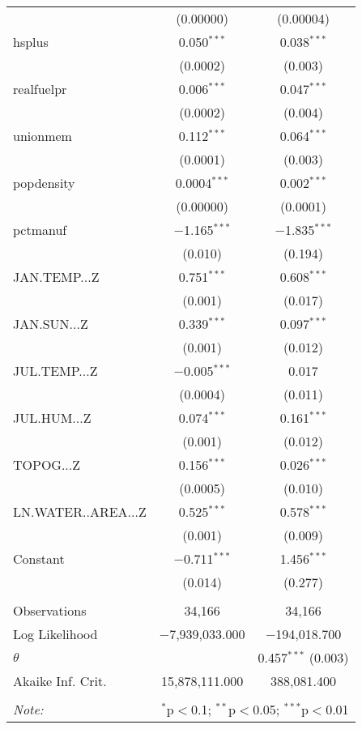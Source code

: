 \begin{table}[!htbp]
\begin{tabular}{@{\extracolsep{5pt}}lcc}
  & (0.00000) & (0.00004) \\ 
  hsplus & 0.050$^{***}$ & 0.038$^{***}$ \\ 
  & (0.0002) & (0.003) \\ 
  realfuelpr & 0.006$^{***}$ & 0.047$^{***}$ \\ 
  & (0.0002) & (0.004) \\ 
  unionmem & 0.112$^{***}$ & 0.064$^{***}$ \\ 
  & (0.0001) & (0.003) \\ 
  popdensity & 0.0004$^{***}$ & 0.002$^{***}$ \\ 
  & (0.00000) & (0.0001) \\ 
  pctmanuf & $-$1.165$^{***}$ & $-$1.835$^{***}$ \\ 
  & (0.010) & (0.194) \\ 
  JAN.TEMP...Z & 0.751$^{***}$ & 0.608$^{***}$ \\ 
  & (0.001) & (0.017) \\ 
  JAN.SUN...Z & 0.339$^{***}$ & 0.097$^{***}$ \\ 
  & (0.001) & (0.012) \\ 
  JUL.TEMP...Z & $-$0.005$^{***}$ & 0.017 \\ 
  & (0.0004) & (0.011) \\ 
  JUL.HUM...Z & 0.074$^{***}$ & 0.161$^{***}$ \\ 
  & (0.001) & (0.012) \\ 
  TOPOG...Z & 0.156$^{***}$ & 0.026$^{***}$ \\ 
  & (0.0005) & (0.010) \\ 
  LN.WATER..AREA...Z & 0.525$^{***}$ & 0.578$^{***}$ \\ 
  & (0.001) & (0.009) \\ 
  Constant & $-$0.711$^{***}$ & 1.456$^{***}$ \\ 
  & (0.014) & (0.277) \\ 
 \hline \\[-1.8ex] 
Observations & 34,166 & 34,166 \\ 
Log Likelihood & $-$7,939,033.000 & $-$194,018.700 \\ 
$\theta$ &  & 0.457$^{***}$  (0.003) \\ 
Akaike Inf. Crit. & 15,878,111.000 & 388,081.400 \\ 
\hline 
\hline \\[-1.8ex] 
\textit{Note:}  & \multicolumn{2}{r}{$^{*}$p$<$0.1; $^{**}$p$<$0.05; $^{***}$p$<$0.01} \\ 
\end{tabular} 
\end{table} 
